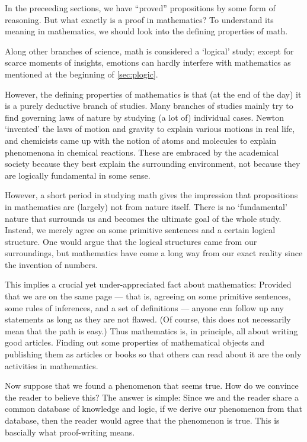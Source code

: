  \label{sec:proof}

In the preceeding sections,
we have ``proved'' propositions by some form of reasoning.
But what exactly is a proof in mathematics?
To understand its meaning in mathematics,
we should look into the defining properties of math.

Along other branches of science,
math is considered a `logical' study;
except for scarce moments of insights,
emotions can hardly interfere with mathematics
as mentioned at the beginning of \cref{sec:plogic}.

However, the defining properties of mathematics is that
(at the end of the day) it is a purely deductive branch of studies.
Many branches of studies mainly try to find governing laws of nature
by studying (a lot of) individual cases.
Newton `invented' the laws of motion and gravity
to explain various motions in real life,
and chemicists came up with the notion of atoms and molecules
to explain phenomenona in chemical reactions.
These are embraced by the academical society
because they best explain the surrounding environment,
not because they are logically fundamental in some sense.

However, a short period in studying math gives the impression that
propositions in mathematics are (largely) not from nature itself.
There is no `fundamental' nature that
surrounds us and becomes the ultimate goal of the whole study.
Instead, we merely agree on
some primitive sentences and a certain logical structure.
One would argue that
the logical structures came from our surroundings,
but mathematics have come a long way from our exact reality
since the invention of numbers.

This implies a crucial yet under-appreciated fact about mathematics:
Provided that we are on the same page
---
that is, agreeing on some primitive sentences,
some rules of inferences,
and a set of definitions
---
anyone can follow up any statements as long as they are not flawed.
(Of course, this does not necessarily mean that the path is easy.)
Thus mathematics is, in principle, all about writing good articles.
Finding out some properties of mathematical objects
and publishing them as articles or books
so that others can read about it
are the only activities in mathematics.

Now suppose that we found a phenomenon that seems true.
How do we convince the reader to believe this?
The answer is simple:
Since we and the reader share a common database of knowledge and logic,
if we derive our phenomenon from that database,
then the reader would agree that the phenomenon is true.
This is bascially what proof-writing means.

